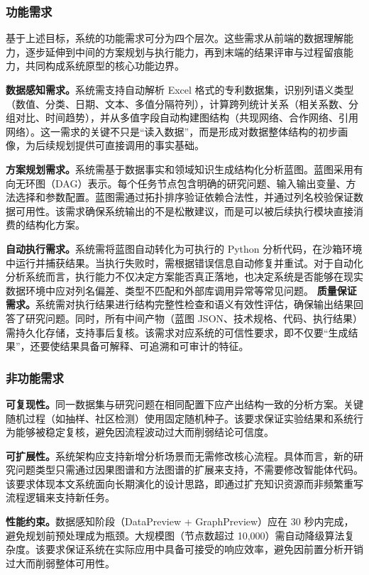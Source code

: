\subsubsection{功能需求}

基于上述目标，系统的功能需求可分为四个层次。这些需求从前端的数据理解能力，逐步延伸到中间的方案规划与执行能力，再到末端的结果评审与过程留痕能力，共同构成系统原型的核心功能边界。

\textbf{数据感知需求。}系统需支持自动解析 Excel 格式的专利数据集，识别列语义类型（数值、分类、日期、文本、多值分隔符列），计算跨列统计关系（相关系数、分组对比、时间趋势），并从多值字段自动构建图结构（共现网络、合作网络、引用网络）。这一需求的关键不只是“读入数据”，而是形成对数据整体结构的初步画像，为后续规划提供可直接调用的事实基础。

\textbf{方案规划需求。}系统需基于数据事实和领域知识生成结构化分析蓝图。蓝图采用有向无环图（DAG）表示。每个任务节点包含明确的研究问题、输入输出变量、方法选择和参数配置。蓝图需通过拓扑排序验证依赖合法性，并通过列名校验保证数据可用性。该需求确保系统输出的不是松散建议，而是可以被后续执行模块直接消费的结构化方案。

\textbf{自动执行需求。}系统需将蓝图自动转化为可执行的 Python 分析代码，在沙箱环境中运行并捕获结果。当执行失败时，需根据错误信息自动修复并重试。对于自动化分析系统而言，执行能力不仅决定方案能否真正落地，也决定系统是否能够在现实数据环境中应对列名偏差、类型不匹配和外部库调用异常等常见问题。
\textbf{质量保证需求。}系统需对执行结果进行结构完整性检查和语义有效性评估，确保输出结果回答了研究问题。同时，所有中间产物（蓝图 JSON、技术规格、代码、执行结果）需持久化存储，支持事后复核。该需求对应系统的可信性要求，即不仅要“生成结果”，还要使结果具备可解释、可追溯和可审计的特征。

\subsubsection{非功能需求}

\textbf{可复现性。}同一数据集与研究问题在相同配置下应产出结构一致的分析方案。关键随机过程（如抽样、社区检测）使用固定随机种子。该要求保证实验结果和系统行为能够被稳定复核，避免因流程波动过大而削弱结论可信度。

\textbf{可扩展性。}系统架构应支持新增分析场景而无需修改核心流程。具体而言，新的研究问题类型只需通过因果图谱和方法图谱的扩展来支持，不需要修改智能体代码。该要求体现本文系统面向长期演化的设计思路，即通过扩充知识资源而非频繁重写流程逻辑来支持新任务。

\textbf{性能约束。}数据感知阶段（DataPreview + GraphPreview）应在 30 秒内完成，避免规划前预处理成为瓶颈。大规模图（节点数超过 10,000）需自动降级算法复杂度。该要求保证系统在实际应用中具备可接受的响应效率，避免因前置分析开销过大而削弱整体可用性。

